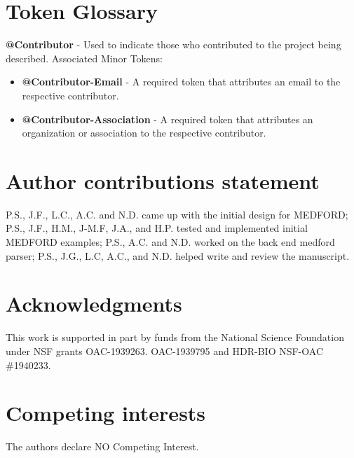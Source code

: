 \documentclass[]{article}%
\begin{document}
\section{Token Glossary}

\textbf{@Contributor} - Used to indicate those who contributed to the project being described.
Associated Minor Tokens:
\begin{itemize}
    \item \textbf{@Contributor-Email} - A required token that attributes an email to the respective contributor.
    \item \textbf{@Contributor-Association} - A required token that attributes an organization or association to the respective contributor.
\end{itemize}

\section{Author contributions statement}



P.S., J.F., L.C., A.C. and N.D. came up with the initial design for MEDFORD; P.S., J.F., H.M., J-M.F, J.A., and H.P. tested and implemented initial MEDFORD examples; P.S., A.C. and N.D. worked on the back end medford parser; P.S., J.G., L.C, A.C., and N.D. helped write and review the manuscript. 
\section{Acknowledgments}
This work is supported in part by funds from the National Science Foundation under NSF grants  OAC-1939263. OAC-1939795 and HDR-BIO NSF-OAC \#1940233.

\section{Competing interests}
The authors declare NO Competing Interest.

%
%



\end{document}
